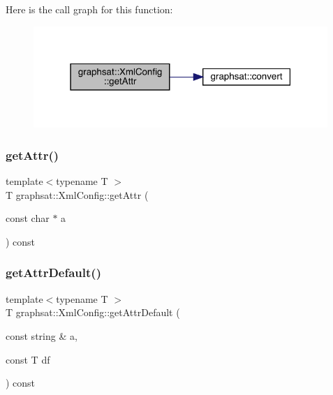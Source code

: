 Here is the call graph for this function\+:\nopagebreak
\begin{figure}[H]
\begin{center}
\leavevmode
\includegraphics[width=316pt]{classgraphsat_1_1_xml_config_a3ac85be6da0905da1e133d519c7e589c_cgraph}
\end{center}
\end{figure}
\mbox{\label{classgraphsat_1_1_xml_config_a27d2882599e816fc2d3b3237689c2b02}} 
\subsubsection{\texorpdfstring{getAttr()}{getAttr()}\hspace{0.1cm}{\footnotesize\ttfamily [4/4]}}
{\footnotesize\ttfamily template$<$typename T $>$ \\
T graphsat\+::\+Xml\+Config\+::get\+Attr (\begin{DoxyParamCaption}\item[{const char $\ast$}]{a }\end{DoxyParamCaption}) const\hspace{0.3cm}{\ttfamily [inline]}}

\mbox{\label{classgraphsat_1_1_xml_config_a1b5a27e8192652ba81540aa9d167438c}} 
\subsubsection{\texorpdfstring{getAttrDefault()}{getAttrDefault()}\hspace{0.1cm}{\footnotesize\ttfamily [1/2]}}
{\footnotesize\ttfamily template$<$typename T $>$ \\
T graphsat\+::\+Xml\+Config\+::get\+Attr\+Default (\begin{DoxyParamCaption}\item[{const string \&}]{a,  }\item[{const T}]{df }\end{DoxyParamCaption}) const\hspace{0.3cm}{\ttfamily [inline]}}

